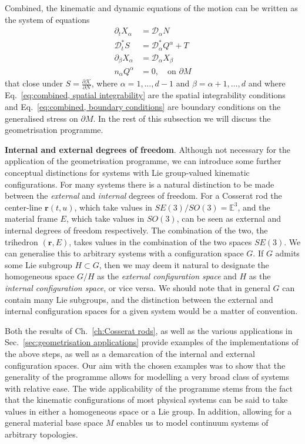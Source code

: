 Combined, the kinematic and dynamic equations of the motion can be written as the system of equations
\begin{subequations} \label{eq:combined, eoms}
\begin{align}
\partial_t X_\alpha & = \mathcal{D}_\alpha N \\
\mathcal{D}^*_t S & = \mathcal{D}^*_\alpha Q^\alpha + T \\
\partial_\beta X_\alpha & = \mathcal{D}_\alpha X_\beta \label{eq:combined, spatial integrability} \\
n_\alpha Q^\alpha & = 0, \quad \text{on } \partial M \label{eq:combined, boundary conditions} 
\end{align}
\end{subequations}
that close under $S = \frac{\partial \mathcal{K}}{\partial N}$, where $\alpha = 1, \dots, d-1$ and $\beta = \alpha+1, \dots, d$ and where Eq.~\ref{eq:combined, spatial integrability} are the spatial integrability conditions and Eq.~\ref{eq:combined, boundary conditions} are boundary conditions on the generalised stress on $\partial M$. In the rest of this subsection we will discuss the geometrisation programme.

\textbf{Internal and external degrees of freedom}. Although not necessary for the application of the geometrisation programme, we can introduce some further conceptual distinctions for systems with Lie group-valued kinematic configurations. For many systems there is a natural distinction to be made between the \textit{external} and \textit{internal} degrees of freedom. For a Cosserat rod the center-line $\mathbf{r}(t,u)$, which take values in $SE(3) / SO(3) = \mathbb{E}^3$, and the material frame $E$, which take values in $SO(3)$, can be seen as external and internal degrees of freedom respectively. The combination of the two, the trihedron $(\mathbf{r}, E)$, takes values in the combination of the two spaces $SE(3)$. We can generalise this to arbitrary systems with a configuration space $G$. If $G$ admits some Lie subgroup $H \subset G$, then we may deem it natural to designate the homogeneous space $G/H$ as the \textit{external configuration space} and $H$ as the \textit{internal configuration space}, or vice versa. We should note that in general $G$ can contain many Lie subgroups, and the distinction between the external and internal configuration spaces for a given system would be a matter of convention.

Both the results of Ch.~\ref{ch:Cosserat rods}, as well as the various applications in Sec.~\ref{sec:geometrisation applications} provide examples of the implementations of the above steps, as well as a demarcation of the internal and external configuration spaces. Our aim with the chosen examples was to show that the generality of the programme allows for modelling a very broad class of systems with relative ease. The wide applicability of the programme stems from the fact that the kinematic configurations of most physical systems can be said to take values in either a homogeneous space or a Lie group. In addition, allowing for a general material base space $M$ enables us to model continuum systems of arbitrary topologies. 

